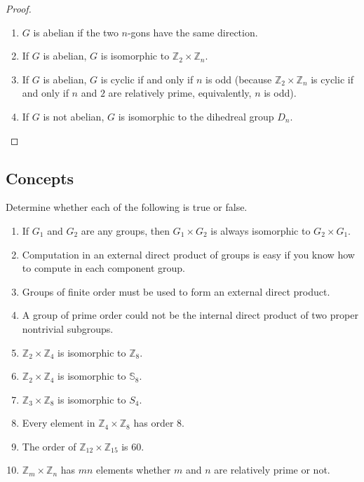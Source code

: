 \begin{proof}
    \begin{enumerate}[label={\textbf{\alph*.}}]
        \item $G$ is abelian if the two $n$-gons have the same direction.
        \item If $G$ is abelian, $G$ is isomorphic to $\mathbb{Z}_{2}\times\mathbb{Z}_{n}$.
        \item If $G$ is abelian, $G$ is cyclic if and only if $n$ is odd (because $\mathbb{Z}_{2}\times\mathbb{Z}_{n}$ is cyclic if and only if $n$ and $2$ are relatively prime, equivalently, $n$ is odd).
        \item If $G$ is not abelian, $G$ is isomorphic to the dihedreal group $D_{n}$.
    \end{enumerate}
\end{proof}

\subsection*{Concepts}

\begin{exercise}
    Determine whether each of the following is true or false.
    \begin{enumerate}[label={\textbf{\alph*.}}]
        \item If $G_{1}$ and $G_{2}$ are any groups, then $G_{1} \times G_{2}$ is always isomorphic to $G_{2} \times G_{1}$.
        \item Computation in an external direct product of groups is easy if you know how to compute in each component group.
        \item Groups of finite order must be used to form an external direct product.
        \item A group of prime order could not be the internal direct product of two proper nontrivial subgroups.
        \item $\mathbb{Z}_{2}\times\mathbb{Z}_{4}$ is isomorphic to $\mathbb{Z}_{8}$.
        \item $\mathbb{Z}_{2}\times\mathbb{Z}_{4}$ is isomorphic to $\mathbb{S}_{8}$.
        \item $\mathbb{Z}_{3}\times\mathbb{Z}_{8}$ is isomorphic to $S_{4}$.
        \item Every element in $\mathbb{Z}_{4}\times\mathbb{Z}_{8}$ has order $8$.
        \item The order of $\mathbb{Z}_{12}\times\mathbb{Z}_{15}$ is $60$.
        \item $\mathbb{Z}_{m} \times \mathbb{Z}_{n}$ has $mn$ elements whether $m$ and $n$ are relatively prime or not.
    \end{enumerate}
\end{exercise}

